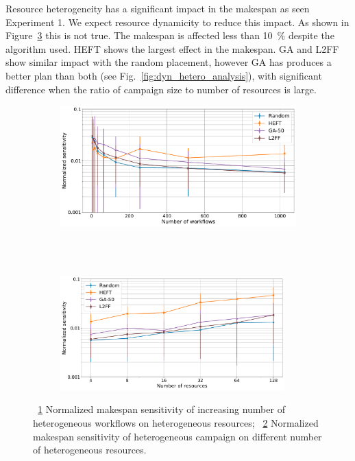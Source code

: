 Resource heterogeneity has a significant impact in the makespan as seen Experiment 1.
We expect resource dynamicity to reduce this impact.
As shown in Figure~\ref{fig:dyn_hetero_sens_analysis} this is not true.
The makespan is affected less than 10~\% despite the algorithm used.
HEFT shows the largest effect in the makespan.
GA and L2FF show similar impact with the random placement, however GA has produces a better plan than both (see Fig.~\ref{fig:dyn_hetero_analysis}), with significant difference when the ratio of campaign size to number of resources is large.

\begin{figure}[ht!]
    \centering
    \begin{subfigure}[b]{0.85\textwidth}
        \includegraphics[width=.95\textwidth]{figures/campaign/StHeteroCampaigns_4DynHeteroResourcesSens.pdf}
        \caption{}
        \label{fig:StHeteroCampaigns_4DyHeteroResourcesSens}
    \end{subfigure}\\
    ~ 
    \begin{subfigure}[b]{0.85\textwidth}
        \includegraphics[width=0.95\textwidth]{figures/campaign/DynHeteroResources_StHeteroCampaignsSens.pdf}
        \caption{}
        \label{fig:DyHeteroResources_StHeteroCampaignsSens}
    \end{subfigure}
    \caption{~\ref{fig:StHeteroCampaigns_4DyHeteroResourcesSens} Normalized makespan sensitivity  of increasing number of heterogeneous workflows on heterogeneous resources;
    ~\ref{fig:DyHeteroResources_StHeteroCampaignsSens} Normalized makespan sensitivity  of heterogeneous campaign on different number of heterogeneous resources.}
    \label{fig:dyn_hetero_sens_analysis}
\end{figure}

